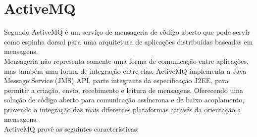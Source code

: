 \begin{figure}[h!]
	\centering
\end{figure}

\section{ActiveMQ}
\label{sec:activemq}

Segundo \cite{Posta} ActiveMQ é um serviço de mensageria de código aberto que pode servir como espinha dorsal para uma arquitetura de aplicações distribuídas baseadas em mensagens. \\
\indent Mensageria não representa somente uma forma de comunicação entre aplicações, mas também uma forma de integração entre elas. ActiveMQ implementa a Java Message Service (JMS) API, parte integrante da especificação J2EE, para permitir a criação, envio, recebimento e leitura de mensagens. Oferecendo uma solução de código aberto para comunicação assíncrona e de baixo acoplamento, provendo a integração das mais diferentes plataformas através da orientação a mensagens. \\
\indent ActiveMQ provê as seguintes características:

